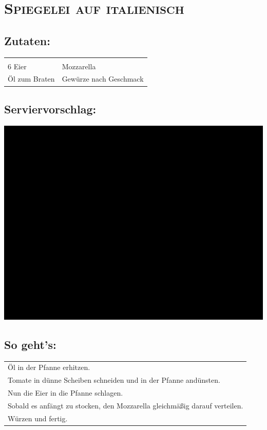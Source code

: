\section{\textsc{Spiegelei auf italienisch}}

\subsection*{Zutaten:}

\begin{tabular}{p{7.5cm} p{7.5cm}}
	& \\
	6 Eier & Mozzarella \\
	Öl zum Braten & Gewürze nach Geschmack
\end{tabular}

\subsection*{Serviervorschlag:}

\includegraphics[width=\textwidth]{img/ph.jpg} \cite{itaspiegelei}

\subsection*{So geht's:}

\begin{tabular}{p{15cm}}
	\\
  Öl in der Pfanne erhitzen.\\
  Tomate in dünne Scheiben schneiden und in der Pfanne andünsten.\\
  Nun die Eier in die Pfanne schlagen.\\
  Sobald es anfängt zu stocken, den Mozzarella gleichmäßig darauf verteilen.\\
  Würzen und fertig.
\end{tabular}
